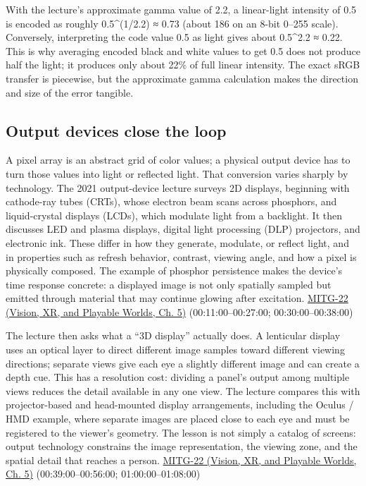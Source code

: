 With the lecture's approximate gamma value of 2.2, a linear-light intensity of 0.5 is encoded as roughly 0.5\^{}(1/2.2) ≈ 0.73 (about 186 on an 8-bit 0--255 scale). Conversely, interpreting the code value 0.5 as light gives about 0.5\^{}2.2 ≈ 0.22. This is why averaging encoded black and white values to get 0.5 does not produce half the light; it produces only about 22\% of full linear intensity. The exact sRGB transfer is piecewise, but the approximate gamma calculation makes the direction and size of the error tangible.

\subsection{Output devices close the loop}\label{03-visual-computing-i-ch004-output-devices-close-the-loop}

\hypertarget{03-visual-computing-i-ch004-output-devices-close-the-loop}{}

A pixel array is an abstract grid of color values; a physical output device has to turn those values into light or reflected light. That conversion varies sharply by technology. The 2021 output-device lecture surveys 2D displays, beginning with cathode-ray tubes (CRTs), whose electron beam scans across phosphors, and liquid-crystal displays (LCDs), which modulate light from a backlight. It then discusses LED and plasma displays, digital light processing (DLP) projectors, and electronic ink. These differ in how they generate, modulate, or reflect light, and in properties such as refresh behavior, contrast, viewing angle, and how a pixel is physically composed. The example of phosphor persistence makes the device's time response concrete: a displayed image is not only spatially sampled but emitted through material that may continue glowing after excitation. \href{../07-Vision-XR-and-Playable-Worlds/main.pdf\#nameddest=04-visual-computing-ii-ch036-mitg-22---output-devices}{MITG-22 (Vision, XR, and Playable Worlds, Ch. 5)} (00:11:00--00:27:00; 00:30:00--00:38:00)

The lecture then asks what a ``3D display'' actually does. A lenticular display uses an optical layer to direct different image samples toward different viewing directions; separate views give each eye a slightly different image and can create a depth cue. This has a resolution cost: dividing a panel's output among multiple views reduces the detail available in any one view. The lecture compares this with projector-based and head-mounted display arrangements, including the Oculus / HMD example, where separate images are placed close to each eye and must be registered to the viewer's geometry. The lesson is not simply a catalog of screens: output technology constrains the image representation, the viewing zone, and the spatial detail that reaches a person. \href{../07-Vision-XR-and-Playable-Worlds/main.pdf\#nameddest=04-visual-computing-ii-ch036-mitg-22---output-devices}{MITG-22 (Vision, XR, and Playable Worlds, Ch. 5)} (00:39:00--00:56:00; 01:00:00--01:08:00)


